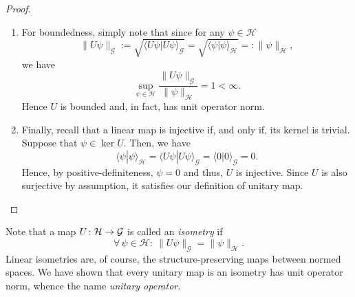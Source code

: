 \begin{proof}
\begin{enumerate}[label=(\roman*)]
\item For boundedness, simply note that since for any $\psi\in\mathcal{H}$
\begin{equation*}
\|U\psi\|_{\mathcal{G}} := \sqrt{\langle U \psi|U\psi \rangle_{\mathcal{G}}} = \sqrt{\langle \psi|\psi \rangle_{\mathcal{H}}} =:\|\psi\|_{\mathcal{H}},
\end{equation*}
we have
\begin{equation*}
\sup_{\psi\in\mathcal{H}}\frac{\|U\psi\|_{\mathcal{G}}}{\|\psi\|_{\mathcal{H}}} = 1 < \infty.
\end{equation*}
Hence $U$ is bounded and, in fact, has unit operator norm.
\item Finally, recall that a linear map is injective if, and only if, its kernel is trivial. Suppose that $\psi\in\ker U$. Then, we have
\begin{equation*}
\langle \psi|\psi \rangle_{\mathcal{H}} = \langle U \psi|U\psi \rangle_{\mathcal{G}}=\langle 0|0 \rangle_{\mathcal{G}}= 0 .
\end{equation*}
Hence, by positive-definiteness, $\psi=0$ and thus, $U$ is injective.
Since $U$ is also surjective by assumption, it satisfies our definition of unitary map.\qedhere
\end{enumerate}
\end{proof}
Note that a map $U\colon\mathcal{H}\to\mathcal{G}$ is called an \emph{isometry} if
\begin{equation*}
\forall \, \psi \in \mathcal{H} : \ \|U\psi\|_{\mathcal{G}} = \|\psi\|_{\mathcal{H}}.
\end{equation*}
Linear isometries are, of course, the structure-preserving maps between normed spaces. We have shown that every unitary map is an isometry has unit operator norm, whence the name \emph{unitary operator}. 

